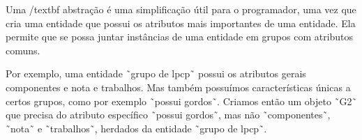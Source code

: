 Uma /textbf {abstração} é uma simplificação útil para o programador, uma vez que cria uma entidade que possui os atributos mais importantes de uma entidade. Ela permite que se possa juntar instâncias de uma entidade em grupos com atributos comuns.

Por exemplo, uma entidade ˜grupo de lpcp˜ possui os atributos gerais componentes e nota e trabalhos. Mas também possuímos características únicas a certos grupos, como por exemplo ˜possui gordos˜. Criamos então um objeto ˜G2˜ que precisa do atributo específico ˜possui gordos˜, mas não ˜componentes˜, ˜nota˜ e ˜trabalhos˜, herdados da entidade ˜grupo de lpcp˜.